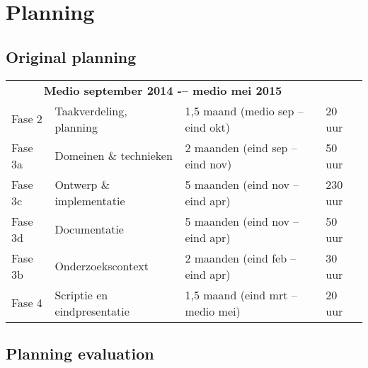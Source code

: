 
\section{Planning}
\subsection{Original planning}
\begin{tabular}{ l l l l }
  \multicolumn{3}{c}{\textbf{Medio september 2014 -– medio mei 2015}} & \\
Fase 2 & Taakverdeling, planning & 1,5 maand (medio sep -- eind okt)          & 20 uur \\
Fase 3a & Domeinen \& technieken & 2 maanden (eind sep -- eind nov)       & 50 uur \\
Fase 3c & Ontwerp \& implementatie & 5 maanden (eind nov -- eind apr)                & 230 uur \\
Fase 3d & Documentatie & 5 maanden (eind nov -- eind apr)                & 50 uur \\
Fase 3b & Onderzoekscontext & 2 maanden (eind feb -- eind apr)                   & 30 uur \\
Fase 4  & Scriptie en eindpresentatie & 1,5 maand (eind mrt -- medio mei)                      & 20 uur
\end{tabular}

\subsection{Planning evaluation}
\lipsum[1]
